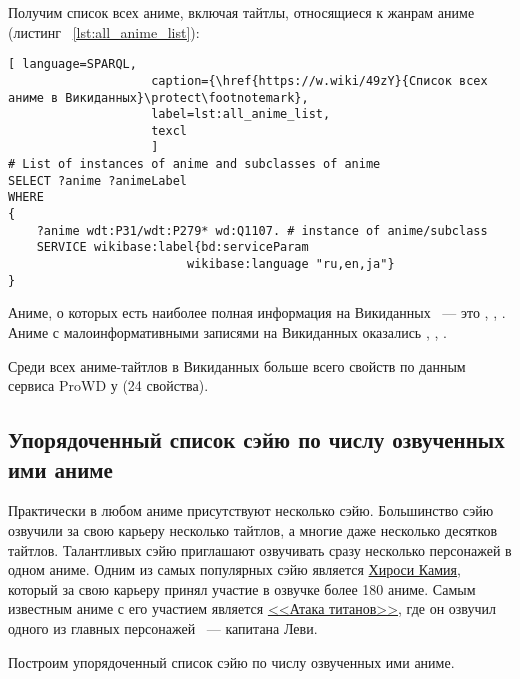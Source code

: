 Получим список всех аниме, включая тайтлы, относящиеся к жанрам аниме (листинг ~\protect\ref{lst:all_anime_list}):

\begin{lstlisting}[ language=SPARQL, 
                    caption={\href{https://w.wiki/49zY}{Список всех аниме в Викиданных}\protect\footnotemark},
                    label=lst:all_anime_list,
                    texcl 
                    ]
# List of instances of anime and subclasses of anime
SELECT ?anime ?animeLabel
WHERE
{
    ?anime wdt:P31/wdt:P279* wd:Q1107. # instance of anime/subclass
    SERVICE wikibase:label{bd:serviceParam
					     wikibase:language "ru,en,ja"}
}
\end{lstlisting}%

Аниме, о которых есть наиболее полная информация на Викиданных ~--- это , , . Аниме с малоинформативными записями на Викиданных оказались , , .

Среди всех аниме-тайтлов в Викиданных больше всего свойств по данным сервиса ProWD\cite{anime_prowd} у  (24 свойства).

\subsection{Упорядоченный список сэйю по числу озвученных ими аниме}

Практически в любом аниме присутствуют несколько сэйю. Большинство сэйю озвучили за свою карьеру несколько тайтлов, а многие даже несколько десятков тайтлов. Талантливых сэйю приглашают озвучивать сразу несколько персонажей в одном аниме. Одним из самых популярных сэйю является \href{https://clck.ru/YSCoP}{Хироси Камия}, который за свою карьеру принял участие в озвучке более 180 аниме. Самым известным аниме с его участием является \href{https://clck.ru/YSCrG}{<<Атака титанов>>}, где он озвучил одного из главных персонажей ~--- капитана Леви.

Построим упорядоченный список сэйю по числу озвученных ими аниме. 

